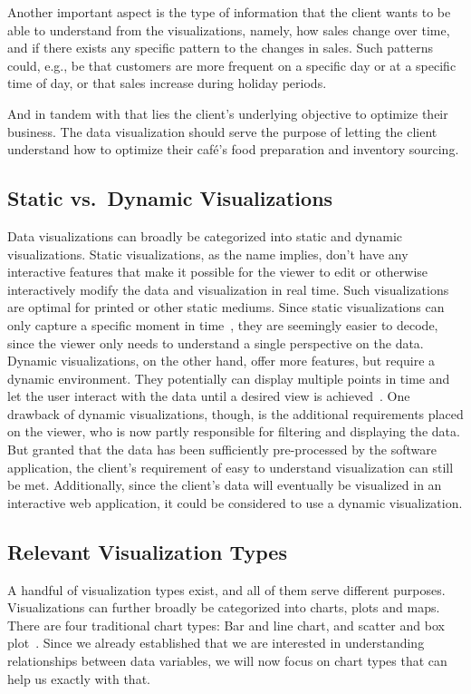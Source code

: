 Another important aspect is the type of information that the client wants to be able to understand from the
visualizations, namely, how sales change over time, and if there exists any specific pattern to the changes in sales.
Such patterns could, e.g., be that customers are more frequent on a specific day or at a specific time of day, or that
sales increase during holiday periods.

And in tandem with that lies the client's underlying objective to optimize their business.
The data visualization should serve the purpose of letting the client understand how to optimize their café's food
preparation and inventory sourcing.

\subsection{Static vs.\ Dynamic Visualizations}\label{subsec:static-vs-dynamic-visualizations}
Data visualizations can broadly be categorized into static and dynamic visualizations.
Static visualizations, as the name implies, don't have any interactive features that make it possible for the viewer to
edit or otherwise interactively modify the data and visualization in real time.
Such visualizations are optimal for printed or other static mediums.
Since static visualizations can only capture a specific moment in time~\cite{wpDataTablesDynamicVisualization}, they are
seemingly easier to decode, since the viewer only needs to understand a single perspective on the data.
Dynamic visualizations, on the other hand, offer more features, but require a dynamic environment.
They potentially can display multiple points in time and let the user interact with the data until a desired view is
achieved~\cite{wpDataTablesDynamicVisualization}.
One drawback of dynamic visualizations, though, is the additional requirements placed on the viewer, who is now partly
responsible for filtering and displaying the data.
But granted that the data has been sufficiently pre-processed by the software application, the client's requirement of
easy to understand visualization can still be met.
Additionally, since the client's data will eventually be visualized in an interactive web application, it could be
considered to use a dynamic visualization.

\subsection{Relevant Visualization Types}\label{subsec:relevant-visualization-types}
A handful of visualization types exist, and all of them serve different purposes.
Visualizations can further broadly be categorized into charts, plots and maps.
There are four traditional chart types: Bar and line chart, and scatter and box plot~\cite{atlassianChartTypes}.
Since we already established that we are interested in understanding relationships between data variables, we will now
focus on chart types that can help us exactly with that.

